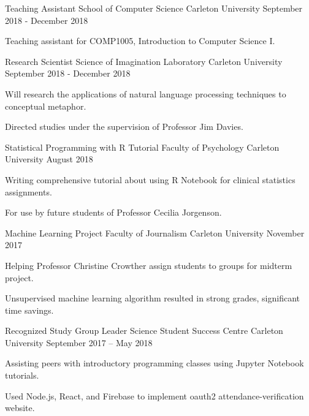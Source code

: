 \documentclass[]{awesome-cv}
\begin{document}
\vspace{-4.5mm}
\begin{cventries}  
    \cventry
      {Teaching Assistant}
      {School of Computer Science}
      {Carleton University}
      {September 2018 - December 2018}
      {\begin{cvitems}
          \item {Teaching assistant for COMP1005, Introduction to Computer Science I.}
          \end{cvitems}}	
    
    \vspace{-4mm}
    \cventry
      {Research Scientist}
      {Science of Imagination Laboratory}
      {Carleton University}
      {September 2018 - December 2018}
      {\begin{cvitems}
          \item {Will research the applications of natural language processing techniques to conceptual metaphor.}
          \item {Directed studies under the supervision of Professor Jim Davies.}
          \end{cvitems}}	
    
    \vspace{-4mm}
    \cventry
      {Statistical Programming with R Tutorial}
      {Faculty of Psychology}
      {Carleton University}
      {August 2018}
      {\begin{cvitems}
      	\item{Writing comprehensive tutorial about using R Notebook for clinical statistics assignments.}
        \item{For use by future students of Professor Cecilia Jorgenson.}
      \end{cvitems}}
   
    \vspace{-4mm}
    \cventry
      {Machine Learning Project}
      {Faculty of Journalism}
      {Carleton University}
      {November 2017}
      {\begin{cvitems}
      	\item{Helping Professor Christine Crowther assign students to groups for midterm project.}
        \item{Unsupervised machine learning algorithm resulted in strong grades, significant time savings.}
      \end{cvitems}}
    
    \vspace{-4mm}
    \cventry
	{Recognized Study Group Leader}
	{Science Student Success Centre}
	{Carleton University}
	{September 2017 – May 2018}
	{\begin{cvitems}
		\item {Assisting peers with introductory programming classes using Jupyter Notebook tutorials.}
		\item {Used Node.js, React, and Firebase to implement oauth2 attendance-verification website.}
		\end{cvitems}}
\end{cventries}
\end{document}
